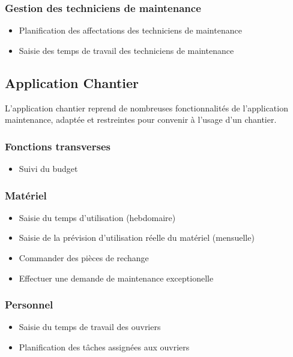 \documentclass [a4paper] {report}
\begin{document}
\subsubsection{Gestion des techniciens de maintenance}
\begin{itemize}
\item Planification des affectations des techniciens de maintenance
\item Saisie des temps de travail des techniciens de maintenance
\end{itemize}


\subsection{Application Chantier}
L'application chantier reprend de nombreuses fonctionnalités de
l'application maintenance, adaptée et restreintes pour convenir à l'usage
d'un chantier.

\subsubsection{Fonctions transverses}
\begin{itemize}
\item Suivi du budget
\end{itemize}

\subsubsection{Matériel}
\begin{itemize}
\item Saisie du temps d'utilisation (hebdomaire)
\item Saisie de la prévision d'utilisation réelle du matériel (mensuelle)
\item Commander des pièces de rechange
\item Effectuer une demande de maintenance exceptionelle
\end{itemize}

\subsubsection{Personnel}
\begin{itemize}
\item Saisie du temps de travail des ouvriers
\item Planification des tâches assignées aux ouvriers
\end{itemize}
\end{document}
